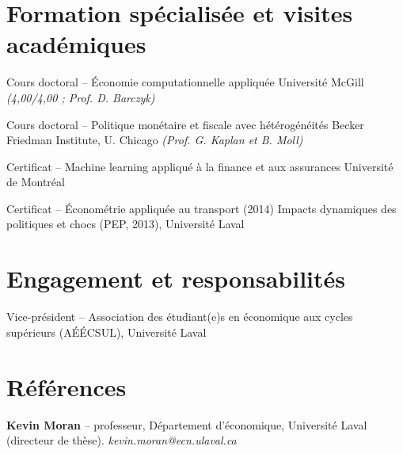 \documentclass[11pt,letterpaper]{article}
\newenvironment{datelist}
  {\begin{description}[style=multiline,leftmargin=2.75cm,labelwidth=2.55cm,
     labelsep=0.2cm,font=\normalfont\small\color{soft},
     itemsep=0.45em,topsep=0.25em,parsep=0.15em]}
  {\end{description}}
\newcommand{\dotsep}{\;\textcolor{soft}{\textbullet}\;}
\newcommand{\meta}[1]{{\small\itshape\color{soft}#1}}
\begin{document}
\section{Formation spécialisée et visites académiques}
\begin{datelist}
  \item[Hiver 2020] Cours doctoral -- Économie computationnelle appliquée \dotsep Université McGill \meta{(4,00/4,00 ; Prof. D. Barczyk)}
  \item[Été 2019] Cours doctoral -- Politique monétaire et fiscale avec hétérogénéités \dotsep Becker Friedman Institute, U. Chicago \meta{(Prof. G. Kaplan et B. Moll)}
  \item[2021] Certificat -- Machine learning appliqué à la finance et aux assurances \dotsep Université de Montréal
  \item[2013--2014] Certificat -- Économétrie appliquée au transport (2014) \dotsep Impacts dynamiques des politiques et chocs (PEP, 2013), Université Laval
\end{datelist}
\section{Engagement et responsabilités}
\begin{datelist}
  \item[2021--2023] Vice-président -- Association des étudiant(e)s en économique aux cycles supérieurs (AÉÉCSUL), Université Laval
\end{datelist}
\section{Références}
\begin{plainlist}
  \item \textbf{Kevin Moran} -- professeur, Département d'économique, Université Laval (directeur de thèse). \meta{kevin.moran@ecn.ulaval.ca}
\end{plainlist}
\end{document}
